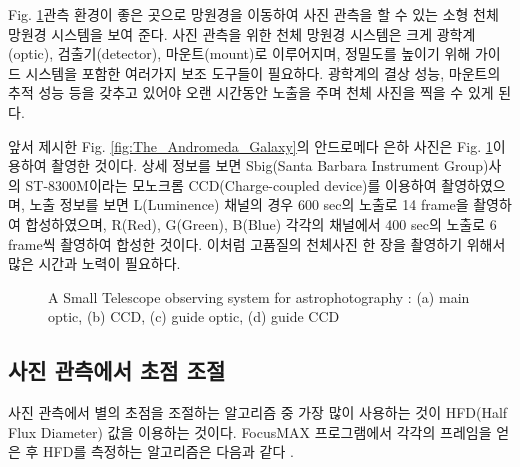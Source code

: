 Fig. \ref{fig:observing_system}\은 관측 환경이 좋은 곳으로 망원경을 이동하여 사진 관측을 할 수 있는 소형 천체 망원경 시스템을 보여 준다. 사진 관측을 위한 천체 망원경 시스템은 크게 광학계(optic), 검출기(detector), 마운트(mount)로 이루어지며, 정밀도를 높이기 위해 가이드 시스템을 포함한 여러가지 보조 도구들이 필요하다. 광학계의 결상 성능, 마운트의 추적 성능 등을 갖추고 있어야 오랜 시간동안 노출을 주며 천체 사진을 찍을 수 있게 된다. 

앞서 제시한 Fig. \ref{fig:The_Andromeda_Galaxy}의 안드로메다 은하 사진은 Fig. \ref{fig:observing_system}\을 이용하여 촬영한 것이다. 상세 정보를 보면 Sbig(Santa Barbara Instrument Group)사의  ST-8300M이라는 모노크롬 CCD(Charge-coupled device)를 이용하여 촬영하였으며, 노출 정보를 보면 L(Luminence) 채널의 경우 600 sec의 노출로 14 frame을 촬영하여 합성하였으며, R(Red), G(Green), B(Blue) 각각의 채널에서 400 sec의 노출로 6 frame씩 촬영하여 합성한 것이다. 이처럼 고품질의 천체사진 한 장을 촬영하기 위해서 많은 시간과 노력이 필요하다. 

\begin{figure}[h]
	\begin{center}
	\end{center}
	\caption{A Small Telescope observing system for astrophotography : (a) main optic, (b) CCD, (c) guide optic, (d) guide CCD}
	\label{fig:observing_system}
\end{figure}


\subsection{사진 관측에서 초점 조절}

사진 관측에서 별의 초점을 조절하는 알고리즘 중 가장 많이 사용하는 것이 HFD(Half Flux Diameter) 값을 이용하는 것이다. FocusMAX 프로그램에서 각각의 프레임을 얻은 후 HFD를 측정하는 알고리즘은 다음과 같다 \cite{weber2001fast}.

